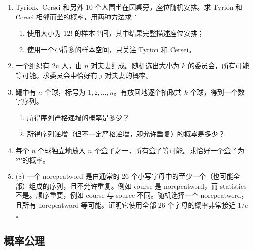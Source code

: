 \documentclass[UTF8,12pt,a4paper,fontset=fandol]{ctexart}
\begin{document}
\begin{enumerate}
  \item Tyrion、Cersei 和另外 10 个人围坐在圆桌旁，座位随机安排。求 Tyrion 和 Cersei 相邻而坐的概率，用两种方法求：
  \begin{enumerate}
    \item 使用大小为 $12!$ 的样本空间，其中结果完整描述座位安排；
    \item 使用一个小得多的样本空间，只关注 Tyrion 和 Cersei。
  \end{enumerate}

  \item 一个组织有 $2n$ 人，由 $n$ 对夫妻组成。随机选出大小为 $k$ 的委员会，所有可能等可能。求委员会中恰好有 $j$ 对夫妻的概率。

  \item 罐中有 $n$ 个球，标号为 $1,2,\ldots,n$。有放回地逐个抽取共 $k$ 个球，得到一个数字序列。
  \begin{enumerate}
    \item 所得序列严格递增的概率是多少？
    \item 所得序列递增（但不一定严格递增，即允许重复）的概率是多少？
  \end{enumerate}

  \item 每个 $n$ 个球独立地放入 $n$ 个盒子之一，所有盒子等可能。求恰好一个盒子为空的概率。

  \item (S) 一个 norepeatword 是由通常的 26 个小写字母中的至少一个（也可能全部）组成的序列，且不允许重复。例如 course 是 norepeatword，而 statistics 不是。顺序重要，例如 course 与 source 不同。随机选择一个 norepeatword，且所有 norepeatword 等可能。证明它使用全部 26 个字母的概率非常接近 $1/e$。
\end{enumerate}

\subsection*{概率公理}
\end{document}
